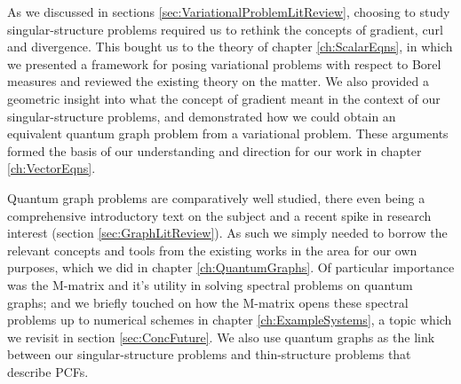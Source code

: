 As we discussed in sections \ref{sec:VariationalProblemLitReview}, choosing to study singular-structure problems required us to rethink the concepts of gradient, curl and divergence.
This bought us to the theory of chapter \ref{ch:ScalarEqns}, in which we presented a framework for posing variational problems with respect to Borel measures and reviewed the existing theory on the matter.
We also provided a geometric insight into what the concept of gradient meant in the context of our singular-structure problems, and demonstrated how we could obtain an equivalent quantum graph problem from a variational problem.
These arguments formed the basis of our understanding and direction for our work in chapter \ref{ch:VectorEqns}. \newline

Quantum graph problems are comparatively well studied, there even being a comprehensive introductory text on the subject and a recent spike in research interest (section \ref{sec:GraphLitReview}).
As such we simply needed to borrow the relevant concepts and tools from the existing works in the area for our own purposes, which we did in chapter \ref{ch:QuantumGraphs}.
Of particular importance was the M-matrix and it's utility in solving spectral problems on quantum graphs; and we briefly touched on how the M-matrix opens these spectral problems up to numerical schemes in chapter \ref{ch:ExampleSystems}, a topic which we revisit in section \ref{sec:ConcFuture}.
We also use quantum graphs as the link between our singular-structure problems and thin-structure problems that describe PCFs.

